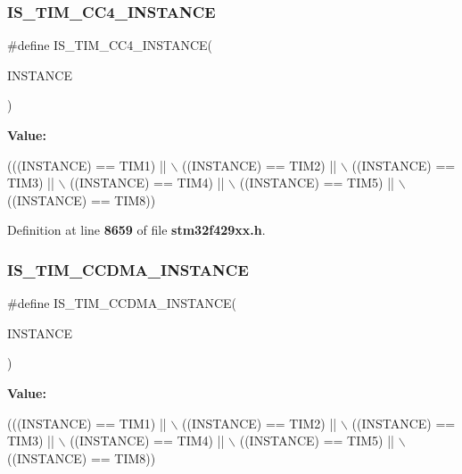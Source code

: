 \subsubsection{I\+S\+\_\+\+T\+I\+M\+\_\+\+C\+C4\+\_\+\+I\+N\+S\+T\+A\+N\+CE}
{\footnotesize\ttfamily \#define I\+S\+\_\+\+T\+I\+M\+\_\+\+C\+C4\+\_\+\+I\+N\+S\+T\+A\+N\+CE(\begin{DoxyParamCaption}\item[{}]{I\+N\+S\+T\+A\+N\+CE }\end{DoxyParamCaption})}

{\bfseries Value\+:}
\begin{DoxyCode}
(((INSTANCE) == TIM1) || \(\backslash\)
                                       ((INSTANCE) == TIM2) || \(\backslash\)
                                       ((INSTANCE) == TIM3) || \(\backslash\)
                                       ((INSTANCE) == TIM4) || \(\backslash\)
                                       ((INSTANCE) == TIM5) || \(\backslash\)
                                       ((INSTANCE) == TIM8))
\end{DoxyCode}


Definition at line \textbf{ 8659} of file \textbf{ stm32f429xx.\+h}.

\mbox{\label{group__Exported__macros_ga8111ef18a809cd882ef327399fdbfc8f}} 
\subsubsection{I\+S\+\_\+\+T\+I\+M\+\_\+\+C\+C\+D\+M\+A\+\_\+\+I\+N\+S\+T\+A\+N\+CE}
{\footnotesize\ttfamily \#define I\+S\+\_\+\+T\+I\+M\+\_\+\+C\+C\+D\+M\+A\+\_\+\+I\+N\+S\+T\+A\+N\+CE(\begin{DoxyParamCaption}\item[{}]{I\+N\+S\+T\+A\+N\+CE }\end{DoxyParamCaption})}

{\bfseries Value\+:}
\begin{DoxyCode}
(((INSTANCE) == TIM1) || \(\backslash\)
                                          ((INSTANCE) == TIM2) || \(\backslash\)
                                          ((INSTANCE) == TIM3) || \(\backslash\)
                                          ((INSTANCE) == TIM4) || \(\backslash\)
                                          ((INSTANCE) == TIM5) || \(\backslash\)
                                          ((INSTANCE) == TIM8))
\end{DoxyCode}


